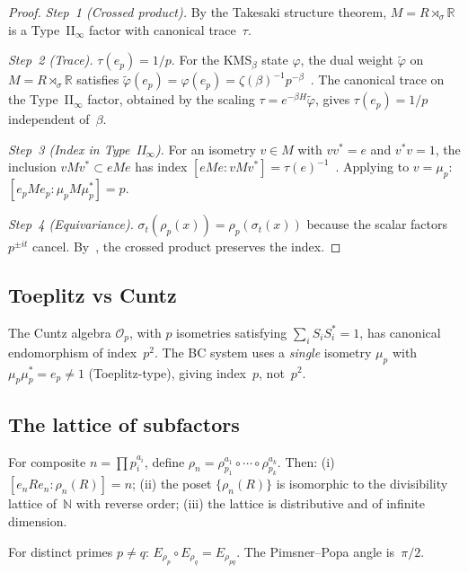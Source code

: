 \documentclass[aps,prl,twocolumn,superscriptaddress,showpacs]{revtex4-2}
\begin{document}
\begin{proof}
\textit{Step~1 (Crossed product).} By the Takesaki structure theorem, $M = R \rtimes_\sigma \mathbb{R}$ is a Type~II$_\infty$ factor with canonical trace~$\tau$.

\textit{Step~2 (Trace).} $\tau(e_p) = 1/p$. For the KMS$_\beta$ state $\varphi$, the dual weight $\tilde{\varphi}$ on $M = R \rtimes_\sigma \mathbb{R}$ satisfies $\tilde{\varphi}(e_p) = \varphi(e_p) = \zeta(\beta)^{-1} p^{-\beta}$~\cite{LacaNeshveyev2004}. The canonical trace on the Type~II$_\infty$ factor, obtained by the scaling $\tau = e^{-\beta H}\tilde{\varphi}$, gives $\tau(e_p) = 1/p$ independent of~$\beta$.

\textit{Step~3 (Index in Type~II$_\infty$).} For an isometry $v \in M$ with $vv^* = e$ and $v^*v = 1$, the inclusion $vMv^* \subset eMe$ has index $[eMe : vMv^*] = \tau(e)^{-1}$~\cite{Jones1983,Kosaki1986}. Applying to $v=\mu_p$: $[e_p M e_p : \mu_p M \mu_p^*] = p$.

\textit{Step~4 (Equivariance).} $\sigma_t(\rho_p(x)) = \rho_p(\sigma_t(x))$ because the scalar factors $p^{\pm it}$ cancel. By~\cite[Prop.~4.2]{Longo1989}, the crossed product preserves the index.
\end{proof}

\subsection{Toeplitz vs Cuntz}

The Cuntz algebra $\mathcal{O}_p$, with $p$ isometries satisfying $\sum_i S_i S_i^* = 1$, has canonical endomorphism of index~$p^2$. The BC system uses a \textit{single} isometry $\mu_p$ with $\mu_p\mu_p^* = e_p \neq 1$ (Toeplitz-type), giving index~$p$, not~$p^2$.

\subsection{The lattice of subfactors}

\begin{theorem}
For composite $n = \prod p_i^{a_i}$, define $\rho_n = \rho_{p_1}^{a_1} \circ \cdots \circ \rho_{p_k}^{a_k}$. Then: (i) $[e_n R e_n : \rho_n(R)] = n$; (ii) the poset $\{\rho_n(R)\}$ is isomorphic to the divisibility lattice of~$\mathbb{N}$ with reverse order; (iii) the lattice is distributive and of infinite dimension.
\end{theorem}

\begin{proposition}[Perpendicularity]
For distinct primes $p \neq q$: $E_{\rho_p} \circ E_{\rho_q} = E_{\rho_{pq}}$. The Pimsner--Popa angle is~$\pi/2$.
\end{proposition}
\end{document}
